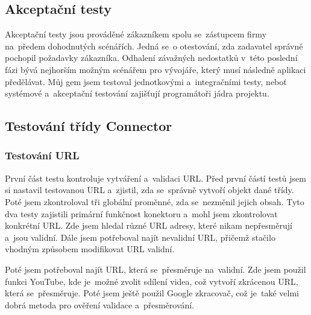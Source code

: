 \subsection{Akceptační testy}
\par Akceptační testy jsou prováděné zákazníkem spolu se~zástupcem firmy na~předem dohodnutých scénářích. Jedná se~o otestování, zda zadavatel správně pochopil požadavky zákazníka. Odhalení závažných nedostatků v~této poslední fázi bývá nejhorším možným scénářem pro vývojáře, který musí následně aplikaci předělávat. Můj gem jsem testoval jednotkovými a~integračními testy, neboť systémové a~akceptační testování zajišťují programátoři jádra projektu.


\subsection{Testování třídy Connector}
\subsubsection{Testování URL}
\par První část testu kontroluje vytváření a~validaci URL. Před první částí testů jsem si nastavil testovanou URL a~zjistil, zda se~správně vytvoří objekt dané třídy. Poté jsem zkontroloval tři globální proměnné, zda se~nezměnil jejich obsah. Tyto dva testy zajistili primární funkčnost konektoru a~mohl jsem zkontrolovat konkrétní URL. Zde jsem hledal různé URL adresy, které nikam nepřesměrují a~jsou validní. Dále jsem potřeboval najít nevalidní URL, přičemž stačilo vhodným způsobem modifikovat URL validní. 
\par Poté jsem potřeboval najít URL, která se~přesměruje na~validní. Zde jsem použil funkci YouTube, kde je~možné zvolit sdílení videa, což vytvoří zkrácenou URL, která se~přesměruje. Poté jsem ještě použil Google zkracovač, což je~také velmi dobrá metoda pro ověření validace a~přesměrování.
